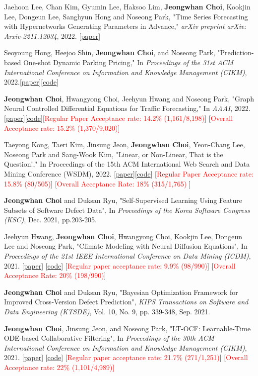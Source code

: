 \documentclass[10pt]{article}
\newenvironment{changemargin}[2]{
  \begin{list}{}{
    \setlength{\topsep}{0pt}
    \setlength{\leftmargin}{#1}
    \setlength{\rightmargin}{#2}
    \setlength{\listparindent}{\parindent}
    \setlength{\itemindent}{\parindent}
    \setlength{\parsep}{\parskip}
  }
  \item[]}{\end{list}
}
\newcommand{\presentation}[2]{
	{#1} \hfill \emph{#2}\\ \bigskip
}
\newcommand{\RED}[1]{\textcolor{red}{#1}}
\newenvironment{body} {
	\vspace*{-16pt}
	\begin{changemargin}{-0.25in}{-0.5in}
  }
	{\end{changemargin}
}
\begin{document}
\begin{body}
\presentation{
Jaehoon Lee, Chan Kim, Gyumin Lee, Haksoo Lim, \textbf{Jeongwhan Choi}, Kookjin Lee, Dongeun Lee, Sanghyun Hong and Noseong Park, "Time Series Forecasting with Hypernetworks Generating Parameters in Advance," \emph{arXiv preprint arXiv: Arxiv-2211.12034}, 2022. [\href{https://arxiv.org/abs/2211.12034}{paper}]}{}
\presentation{Seoyoung Hong, Heejoo Shin, \textbf{Jeongwhan Choi}, and Noseong Park, "Prediction-based One-shot Dynamic Parking Pricing," In \emph{Proceedings of the 31st ACM International Conference on Information and Knowledge Management (CIKM)}, 2022.[\href{https://arxiv.org/abs/2208.14231}{paper}][\href{https://github.com/jeongwhanchoi/one-shot-optimization}{code}]}{}
\presentation{\textbf{Jeongwhan Choi}, Hwangyong Choi, Jeehyun Hwang and Noseong Park, "Graph Neural Controlled Differential Equations for Traffic Forecasting," In \emph{AAAI}, 2022. [\href{https://ojs.aaai.org/index.php/AAAI/article/download/20587/20346}{paper}][\href{https://github.com/jeongwhanchoi/STG-NCDE}{code}][\RED{Regular Paper Acceptance rate: 14.2\% (1,161/8,198)}] [\RED{Overall Acceptance rate: 15.2\% (1,370/9,020)] }} {}
\presentation{Taeyong Kong, Taeri Kim, Jinsung Jeon, \textbf{Jeongwhan Choi}, Yeon-Chang Lee, Noseong Park and Sang-Wook Kim, "Linear, or Non-Linear, That is the Question!," In Proceedings of the 15th ACM International Web Search and Data Mining Conference (WSDM), 2022.  [\href{https://arxiv.org/abs/2111.07265}{paper}][\href{https://github.com/jeongwhanchoi/HMLET}{code}] [\RED{Regular Paper Acceptance rate: 15.8\% (80/505)}] [\RED{Overall Acceptance Rate: 18\%  (315/1,765)} ]}{}
\presentation{\textbf{Jeongwhan Choi} and Duksan Ryu, "Self-Supervised Learning Using Feature Subsets of Software Defect Data",  In \emph{Proceedings of the Korea Software Congress (KSC)}, Dec. 2021, pp.203-205.}{}
\presentation{Jeehyun Hwang, \textbf{Jeongwhan Choi}, Hwangyong Choi, Kookjin Lee, Dongeun Lee and Noseong Park, "Climate Modeling with Neural Diffusion Equations", In \emph{Proceedings of the 21st IEEE International Conference on Data Mining (ICDM)}, 2021.  [\href{https://arxiv.org/abs/2111.06011}{paper}] [\href{https://github.com/jeongwhanchoi/Neural-Diffusion-Equation}{code}] [\RED{Regular paper acceptance rate: 9.9\%  (98/990)}] [\RED{Overall Acceptance Rate: 20\%  (198/990)}]}{}
\presentation{\textbf{Jeongwhan Choi} and Duksan Ryu, "Bayesian Optimization Framework for Improved Cross-Version Defect Prediction", \emph{KIPS Transactions on Software and Data Engineering (KTSDE)}, Vol. 10, No. 9, pp. 339-348, Sep. 2021.}{}
\presentation{\textbf{Jeongwhan Choi}, Jinsung Jeon, and Noseong Park,  "LT-OCF: Learnable-Time ODE-based Collaborative Filtering", In \emph{Proceedings of the 30th ACM International Conference on Information and Knowledge Management (CIKM)}, 2021. [\href{https://arxiv.org/pdf/2108.06208.pdf}{paper}] [\href{https://github.com/jeongwhanchoi/LT-OCF}{code}]  [\RED{Regular paper acceptance rate: 21.7\% (271/1,251)}]  [\RED{Overall Acceptance rate: 22\% (1,101/4,989)]} }{}

\end{body}
\end{document}
